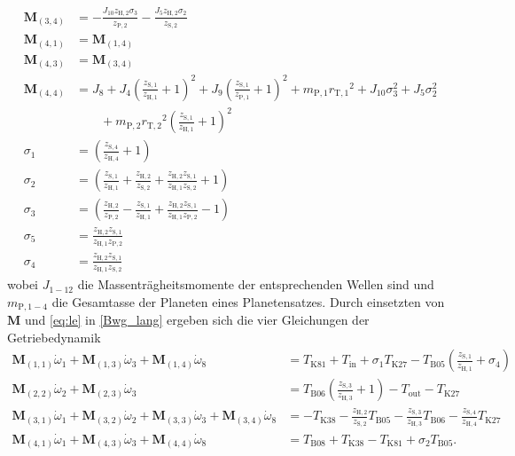 \begin{align*}
	\pmb{M}_{(3,4)} &= -\frac{J_{10} z_\mathrm{H,2} \sigma_{3}}{z_\mathrm{P,2}} - \frac{J_{5} z_\mathrm{H,2} \sigma_{2}}{z_\mathrm{S,2}}\\
	\pmb{M}_{(4,1)} &= \pmb{M}_{(1,4)}\\
	\pmb{M}_{(4,3)} &= \pmb{M}_{(3,4)}\\
	\pmb{M}_{(4,4)} &= J_8+J_4 \left(\frac{z_\mathrm{S,1}}{z_\mathrm{H,1}}+1\right)^2+J_{9} \left(\frac{z_\mathrm{S,1}}{z_\mathrm{P,1}}+1\right)^2+m_\mathrm{P,1} {r_\mathrm{T,1}}^2+J_{10} \sigma_{3}^2+J_5 \sigma_{2}^2 \\
		&\qquad + m_\mathrm{P,2} {r_\mathrm{T,2}}^2 \left(\frac{z_\mathrm{S,1}}{z_\mathrm{H,1}}+1\right)^2\\
	\sigma_1 &= \left(\frac{z_{\mathrm{S,4}}}{z_{\mathrm{H,4}}}+1\right) \\
	\sigma_{2} &= \left(\frac{z_\mathrm{S,1}}{z_\mathrm{H,1}}+\frac{z_\mathrm{H,2}}{z_\mathrm{S,2}}+\frac{z_\mathrm{H,2} z_\mathrm{S,1}}{z_\mathrm{H,1} z_\mathrm{S,2}}+1\right)\\
	\sigma_{3} &= \left(\frac{z_\mathrm{H,2}}{z_\mathrm{P,2}}-\frac{z_\mathrm{S,1}}{z_\mathrm{H,1}}+\frac{z_\mathrm{H,2} z_\mathrm{S,1}}{z_\mathrm{H,1} z_\mathrm{P,2}}-1\right) \\
	\sigma_{5} &= \frac{z_\mathrm{H,2} z_\mathrm{S,1}}{z_\mathrm{H,1} z_\mathrm{P,2}} \\
	\sigma_{4} &= \frac{z_\mathrm{H,2} z_\mathrm{S,1}}{z_\mathrm{H,1} z_\mathrm{S,2}}
\end{align*}
wobei $J_{1-12}$ die Massenträgheitsmomente der entsprechenden Wellen sind und $m_{\mathrm{P},1-4}$ die Gesamtasse der Planeten eines Planetensatzes. Durch einsetzten von $\pmb{M}$ und \eqref{eq:le} in \eqref{Bwg_lang} ergeben sich die vier Gleichungen der Getriebedynamik
\begin{subequations} \label{eq:bewegungs_gleichungen}
	\begin{align}
		\pmb{M}_{(1,1)} \dot{\omega}_1 + \pmb{M}_{(1,3)} \dot{\omega}_3 +\pmb{M}_{(1,4)} \dot{\omega}_8
		&= T_{\mathrm{K81}} +T_{\mathrm{in}} + \sigma_1 T_{\mathrm{K27}}-T_{\mathrm{B05}} {\left(\frac{z_{\mathrm{S,1}} }{z_{\mathrm{H,1}}}+\sigma_{4} \right)}\\
		\pmb{M}_{(2,2)} \dot{\omega}_2 + \pmb{M}_{(2,3)} \dot{\omega}_3
		&= T_{\mathrm{B06}} {\left(\frac{z_{\mathrm{S,3}} }{z_{\mathrm{H,3}} }+1\right)}-T_{\mathrm{out}} -T_{\mathrm{K27}} \\
		\pmb{M}_{(3,1)} \dot{\omega}_1 + \pmb{M}_{(3,2)} \dot{\omega}_2 + \pmb{M}_{(3,3)} \dot{\omega}_3 + \pmb{M}_{(3,4)} \dot{\omega}_8
		&= -T_{\mathrm{K38}} -\frac{ z_{\mathrm{H,2}} }{z_{\mathrm{S,2}} }T_{\mathrm{B05}}-\frac{z_{\mathrm{S,3}}}{z_{\mathrm{H,3}}}T_{\mathrm{B06}}-\frac{z_{\mathrm{S,4}} }{z_{\mathrm{H,4}}}T_{\mathrm{K27}}\\
		\pmb{M}_{(4,1)} \dot{\omega}_1 + \pmb{M}_{(4,3)} \dot{\omega}_3 + \pmb{M}_{(4,4)} \dot{\omega}_8
		&= T_{\mathrm{B08}} +T_{\mathrm{K38}} -T_{\mathrm{K81}} +\sigma_{2} T_{\mathrm{B05}}.
	\end{align}
\end{subequations}
